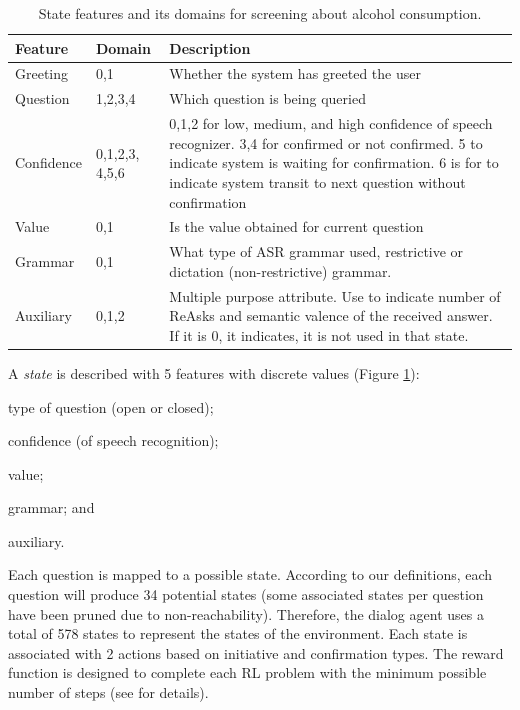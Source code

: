 \documentclass[letterpaper]{article}
\begin{document}
\begin{inparaenum}[1)]
\begin{table}[!ht]
\caption{State features and its domains for screening about alcohol consumption.}
\label{FeaturesRepresentation}
\begin{tabular}{ | p{16mm} | p{13mm} | p{49mm} | } \hline
    \textbf{Feature} & \textbf{Domain} & \textbf{Description} \\
    \hline
    Greeting & 0,1 & Whether the system has greeted the user \\
    \hline
    Question & 1,2,3,4 & Which question is being queried \\
    \hline
    Confidence & 0,1,2,3, 4,5,6 & 0,1,2 for low, medium, and high confidence of speech 
recognizer. 3,4 for confirmed or not confirmed. 5 to indicate system is waiting for confirmation. 6 
is for to indicate system transit to next question without confirmation \\
    \hline
  Value & 0,1 & Is the value obtained for current question \\
  \hline
  Grammar & 0,1 & What type of ASR grammar used, restrictive or dictation (non-restrictive) 
grammar.  \\
    \hline
      Auxiliary & 0,1,2 & Multiple purpose attribute. Use to indicate number of ReAsks and semantic 
valence of the received answer. If it is 0, it indicates, it is not used in that state.  \\
        \hline
\end{tabular}
\end{table}


A {\em state} is described with 5 features with discrete values (Figure 
\ref{FeaturesRepresentation}): \begin{inparaenum}[1)] \item type of question (open or closed); 
\item confidence (of speech recognition); \item value; \item grammar; and \item auxiliary. \end{inparaenum} Each 
question is mapped to a possible state. According to our definitions, each question will produce 34 
potential states (some associated states per question have been pruned due to non-reachability). 
Therefore, the dialog agent uses a total of 578 states to represent the states of the environment. Each 
state is associated with 2 actions based on initiative and  confirmation types. The reward 
function is designed to complete each RL problem with the minimum possible number of steps (see \cite{YASCLL14} for details).  


\end{inparaenum}
\end{document}
